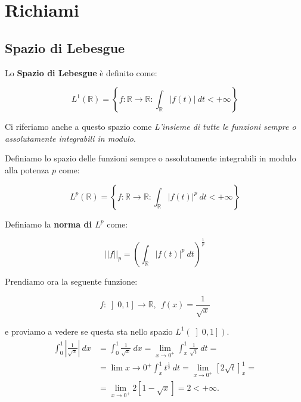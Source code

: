 \chapter{Richiami}

\section{Spazio di Lebesgue}

\begin{definition}
    Lo \textbf{Spazio di Lebesgue} è definito come:

    $$
        L^1(\mathbb{R}) = \left \{ f: \mathbb{R} \rightarrow \mathbb{R} : \int_\mathbb{R} |f(t)| \ dt < +\infty \right \}
    $$
\end{definition}

Ci riferiamo anche a questo spazio come \textit{L'insieme di tutte le funzioni
    sempre o assolutamente integrabili in modulo}.

\begin{definition}
    Definiamo lo spazio delle funzioni sempre o assolutamente integrabili in
    modulo alla potenza $p$ come:

    $$
        L^p(\mathbb{R}) = \left \{ f: \mathbb{R} \rightarrow \mathbb{R} : \int_\mathbb{R} |f(t)|^p \ dt < +\infty \right \}
    $$
\end{definition}

\begin{definition}
    Definiamo la \textbf{norma di $L^p$} come:

    $$
        ||f||_p = \left( \int_{\mathbb{R}} |f(t)|^p \ dt \right)^{\frac{1}{p}}
    $$
\end{definition}

Prendiamo ora la seguente funzione:

$$
    f : \left] 0, 1 \right] \rightarrow \mathbb{R}, \ \ f(x) = \frac{1}{\sqrt{x}}
$$

e proviamo a vedere se questa sta nello spazio $L^1(\left] 0, 1 \right])$.
\begin{equation}
    \begin{aligned}
        \int_{0}^{1} |\frac{1}{\sqrt{x}}| \ dx & = \int_{0}^{1} \frac{1}{\sqrt{x}} \ dx = \lim_{x \rightarrow 0^+} \int_{x}^{1} \frac{1}{\sqrt{t}} \ dt =        \\
                                               & = \lim{x \rightarrow 0^+} \int_{x}^{1} t^{\frac{1}{2}} \ dt = \lim_{x \rightarrow 0^+} [ 2 \sqrt{t} ]_{x}^{1} = \\
                                               & = \lim_{x \rightarrow 0^+} 2 [1 - \sqrt{x}] = 2 < +\infty.
    \end{aligned}
\end{equation}


